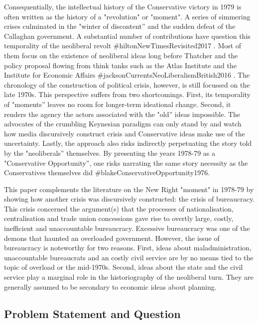 \documentclass[
]{article}
\begin{document}
Consequentially, the intellectual history of the Conservative victory in
1979 is often written as the history of a "revolution" or "moment". A
series of simmering crises culminated in the "winter of discontent'' and
the sudden defeat of the Callaghan government. A substantial number of
contributions have question this temporality of the neoliberal revolt
\#hiltonNewTimesRevisited2017 . Most of them focus on the existence of
neoliberal ideas long before Thatcher and the policy proposal flowing
from think tanks such as the Atlas Institute and the Institute for
Economic Affairs \#jacksonCurrentsNeoLiberalismBritish2016 . The
chronology of the construction of political crisis, however, is still
focussed on the late 1970s. This perspective suffers from two
shortcomings. First, its temporality of "moments'' leaves no room for
longer-term ideational change. Second, it renders the agency the actors
associated with the "old'' ideas impossible. The advocates of the
crumbling Keynesian paradigm can only stand by and watch how media
discursively construct crisis and Conservative ideas make use of the
uncertainty. Lastly, the approach also risks indirectly perpetuating the
story told by the "neoliberals'' themselves. By presenting the years
1978-79 as a "Conservative Opportunity'', one risks narrating the same
story necessity as the Conservatives themselves did
\#blakeConservativeOpportunity1976.

This paper complements the literature on the New Right "moment" in
1978-79 by showing how another crisis was discursively constructed: the
crisis of bureaucracy. This crisis concerned the argument(s) that the
processes of nationalisation, centralisation and trade union concessions
gave rise to overtly large, costly, inefficient and unaccountable
bureaucracy. Excessive bureaucracy was one of the demons that haunted an
overloaded government. However, the issue of bureaucracy is noteworthy
for two reasons. First, ideas about maladministration, unaccountable
bureaucrats and an costly civil service are by no means tied to the
topic of overload or the mid-1970s. Second, ideas about the state and
the civil service play a marginal role in the historiography of the
neoliberal turn. They are generally assumed to be secondary to economic
ideas about planning.

\hypertarget{header-n7}{%
\subsection{Problem Statement and Question}\label{header-n7}}
\end{document}
